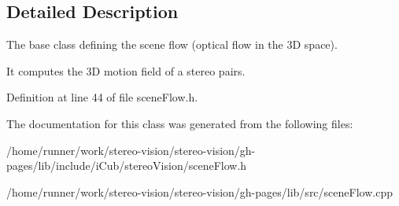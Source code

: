 \subsection{Detailed Description}
The base class defining the scene flow (optical flow in the 3D space). 

It computes the 3D motion field of a stereo pairs. 

Definition at line 44 of file scene\+Flow.\+h.



The documentation for this class was generated from the following files\+:\begin{DoxyCompactItemize}
\item 
/home/runner/work/stereo-\/vision/stereo-\/vision/gh-\/pages/lib/include/i\+Cub/stereo\+Vision/scene\+Flow.\+h\item 
/home/runner/work/stereo-\/vision/stereo-\/vision/gh-\/pages/lib/src/scene\+Flow.\+cpp\end{DoxyCompactItemize}
